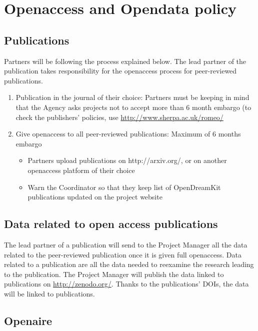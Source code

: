 \documentclass{../../Proposal/LaTeX-proposal/deliverablereport}
\begin{document}
\section{Openaccess and Opendata policy}
\subsection{Publications}


Partners will be following the process explained below. The lead partner of the publication takes responsibility for the openaccess process for peer-reviewed publications.
\begin{enumerate}
\item{Publication in the journal of their choice:} Partners must be keeping in mind that the Agency asks projects not to accept more than 6 month embargo (to check the publishers’ policies, use \href{http://www.sherpa.ac.uk/romeo/}{http://www.sherpa.ac.uk/romeo/}
\item{Give openaccess to all peer-reviewed publications:} Maximum of 6 months embargo
\begin{itemize}
\item{Partners upload publications on http://arxiv.org/, or on another openaccess platform of their choice}
\item{Warn the Coordinator so that they keep list of OpenDreamKit publications updated on the project website}
\end{itemize}
\end{enumerate}


\subsection{Data related to open access publications}


The lead partner of a publication will send to the Project Manager all the data related to the peer-reviewed publication once it is given full openaccess. Data related to a publication are all the data needed to reexamine the research leading to the publication.
The Project Manager will publish the data linked to publications on \href{http://zenodo.org/}{http://zenodo.org/}. Thanks to the publications’ DOIs, the data will be linked to publications.



\subsection{Openaire}
\end{document}

